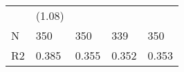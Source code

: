 {\begin{table}
\begin{center}
\begin{tabular}{lllll}
                                              & (1.08)              &                      &                       &                         \\
    N                                         & 350                 & 350                  & 339                   & 350                     \\
    R2                                        & 0.385               & 0.355                & 0.352                 & 0.353                   \\
    \hline
    \end{tabular}
    \end{center}
    \end{table}
    
}
